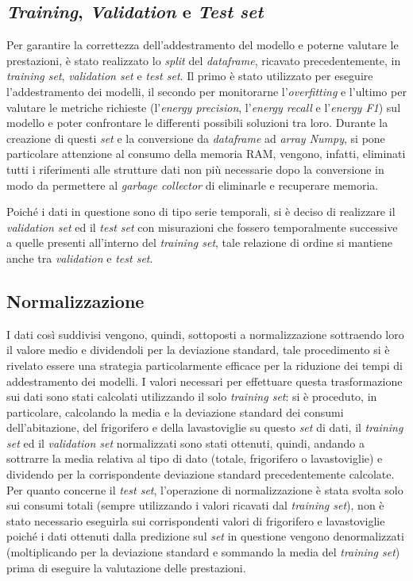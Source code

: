 \documentclass[12pt,a4paper,fleqn]{article}
\begin{document}
\subsection{\textsl{Training}, \textsl{Validation} e \textsl{Test set}}
Per garantire la correttezza dell'addestramento del modello e poterne valutare le prestazioni, è stato realizzato lo \textsl{split} del \textsl{dataframe}, ricavato precedentemente, in \textsl{training set}, \textsl{validation set} e \textsl{test set}. Il primo è stato utilizzato per eseguire l'addestramento dei modelli, il secondo per monitorarne l'\textsl{overfitting} e l'ultimo per valutare le metriche richieste (l'\textit{energy precision}, l'\textsl{energy recall} e l'\textsl{energy F1}) sul modello e poter confrontare le differenti possibili soluzioni tra loro. Durante la creazione di questi \textsl{set} e la conversione da \textsl{dataframe} ad \textsl{array Numpy}, si pone particolare attenzione al consumo della memoria RAM, vengono, infatti, eliminati tutti i riferimenti alle strutture dati non più necessarie dopo la conversione in modo da permettere al \textsl{garbage collector} di eliminarle e recuperare memoria.

Poiché i dati in questione sono di tipo serie temporali, si è deciso di realizzare il \textsl{validation set} ed il \textsl{test set} con misurazioni che fossero temporalmente successive a quelle presenti all'interno del \textsl{training set}, tale relazione di ordine si mantiene anche tra \textsl{validation} e \textsl{test set}.

\subsection{Normalizzazione}
I dati così suddivisi vengono, quindi, sottoposti a normalizzazione sottraendo loro il valore medio e dividendoli per la deviazione standard, tale procedimento si è rivelato essere una strategia particolarmente efficace per la riduzione dei tempi di addestramento dei modelli. I valori necessari per effettuare questa trasformazione sui dati sono stati calcolati utilizzando il solo \textsl{training set}: si è proceduto, in particolare, calcolando la media e la deviazione standard dei consumi dell'abitazione, del frigorifero e della lavastoviglie su questo \textsl{set} di dati, il \textsl{training set} ed il \textsl{validation set} normalizzati sono stati ottenuti, quindi, andando a sottrarre la media relativa al tipo di dato (totale, frigorifero o lavastoviglie) e dividendo per la corrispondente deviazione standard precedentemente calcolate. Per quanto concerne il \textsl{test set}, l'operazione di normalizzazione è stata svolta solo sui consumi totali (sempre utilizzando i valori ricavati dal \textsl{training set}), non è stato necessario eseguirla sui corrispondenti valori di frigorifero e lavastoviglie poiché i dati ottenuti dalla predizione sul \textsl{set} in questione vengono denormalizzati (moltiplicando per la deviazione standard e sommando la media del \textsl{training set}) prima di eseguire la valutazione delle prestazioni.
\end{document}
